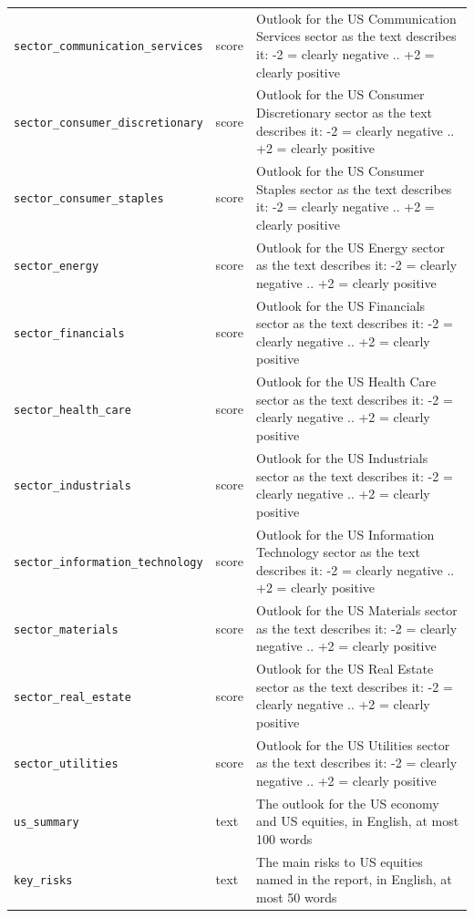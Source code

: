 \documentclass[xelatex,ja=standard,jafont=hiragino-pron,a4paper,10pt]{bxjsreport}
\begin{document}
{\begin{longtable}{p{4.40cm}p{1.20cm}p{8.60cm}}
\texttt{sector\_\allowbreak{}communication\_\allowbreak{}services} & score & Outlook for the US Communication Services sector as the text describes it: -2 = clearly negative .. +2 = clearly positive \\
\texttt{sector\_\allowbreak{}consumer\_\allowbreak{}discretionary} & score & Outlook for the US Consumer Discretionary sector as the text describes it: -2 = clearly negative .. +2 = clearly positive \\
\texttt{sector\_\allowbreak{}consumer\_\allowbreak{}staples} & score & Outlook for the US Consumer Staples sector as the text describes it: -2 = clearly negative .. +2 = clearly positive \\
\texttt{sector\_\allowbreak{}energy} & score & Outlook for the US Energy sector as the text describes it: -2 = clearly negative .. +2 = clearly positive \\
\texttt{sector\_\allowbreak{}financials} & score & Outlook for the US Financials sector as the text describes it: -2 = clearly negative .. +2 = clearly positive \\
\texttt{sector\_\allowbreak{}health\_\allowbreak{}care} & score & Outlook for the US Health Care sector as the text describes it: -2 = clearly negative .. +2 = clearly positive \\
\texttt{sector\_\allowbreak{}industrials} & score & Outlook for the US Industrials sector as the text describes it: -2 = clearly negative .. +2 = clearly positive \\
\texttt{sector\_\allowbreak{}information\_\allowbreak{}technology} & score & Outlook for the US Information Technology sector as the text describes it: -2 = clearly negative .. +2 = clearly positive \\
\texttt{sector\_\allowbreak{}materials} & score & Outlook for the US Materials sector as the text describes it: -2 = clearly negative .. +2 = clearly positive \\
\texttt{sector\_\allowbreak{}real\_\allowbreak{}estate} & score & Outlook for the US Real Estate sector as the text describes it: -2 = clearly negative .. +2 = clearly positive \\
\texttt{sector\_\allowbreak{}utilities} & score & Outlook for the US Utilities sector as the text describes it: -2 = clearly negative .. +2 = clearly positive \\
\texttt{us\_\allowbreak{}summary} & text & The outlook for the US economy and US equities, in English, at most 100 words \\
\texttt{key\_\allowbreak{}risks} & text & The main risks to US equities named in the report, in English, at most 50 words \\
\end{longtable}
}
\end{document}

